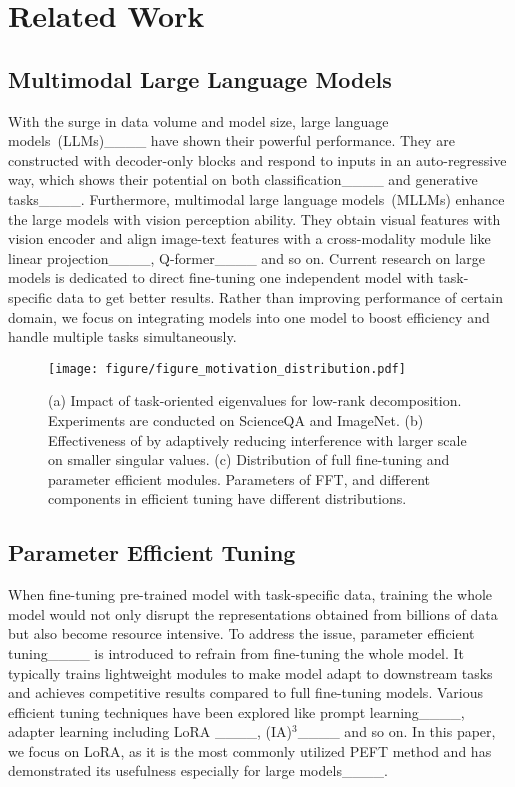 \section{Related Work}
\subsection{Multimodal Large Language Models}
With the surge in data volume and model size, large language models~(LLMs)____ have shown their powerful performance. They are constructed with decoder-only blocks and respond to inputs in an auto-regressive way, which shows their potential on both classification____ and generative tasks____. Furthermore, multimodal large language models~(MLLMs) enhance the large models with vision perception ability. They obtain visual features with vision encoder and align image-text features with a cross-modality module like linear projection____, Q-former____ and so on. Current research on large models is dedicated to direct fine-tuning one independent model with task-specific data to get better results. Rather than improving performance of certain domain, we focus on integrating models into one model to boost efficiency and handle multiple tasks simultaneously.

\begin{figure*}
    \centering
    \texttt{[image: figure/figure\_motivation\_distribution.pdf]}
    \vspace{-25pt}
    \caption{(a) Impact of task-oriented eigenvalues for low-rank decomposition. Experiments are conducted on ScienceQA and ImageNet. (b) Effectiveness of \modelname{} by adaptively reducing interference with larger scale on smaller singular values. (c) Distribution of full fine-tuning and parameter efficient modules. Parameters of FFT, and different components in efficient tuning have different distributions.}
    \label{fig:motivation-distribution}
    \vspace{-15pt}
\end{figure*}

\subsection{Parameter Efficient Tuning}
When fine-tuning pre-trained model with task-specific data, training the whole model would not only disrupt the representations obtained from billions of data but also become resource intensive. To address the issue, parameter efficient tuning____ is introduced to refrain from fine-tuning the whole model. It typically trains lightweight modules to make model adapt to downstream tasks and achieves competitive results compared to full fine-tuning models. Various efficient tuning techniques have been explored like prompt learning____, adapter learning including LoRA ____, (IA)$^3$____ and so on. In this paper, we focus on LoRA, as it is the most commonly utilized PEFT method and has demonstrated its usefulness especially for large models____.


